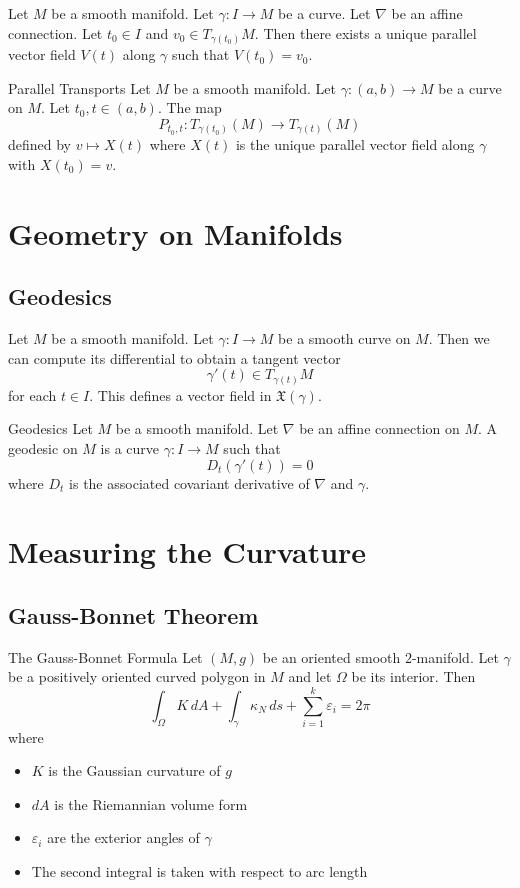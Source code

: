 \documentclass[a4paper]{article}
\begin{document}
\begin{thm}{}{} Let $M$ be a smooth manifold. Let $\gamma:I\to M$ be a curve. Let $\nabla$ be an affine connection. Let $t_0\in I$ and $v_0\in T_{\gamma(t_0)}M$. Then there exists a unique parallel vector field $V(t)$ along $\gamma$ such that $V(t_0)=v_0$. 
\end{thm}

\begin{defn}{Parallel Transports}{} Let $M$ be a smooth manifold. Let $\gamma:(a,b)\to M$ be a curve on $M$. Let $t_0,t\in(a,b)$. The map $$P_{t_0,t}:T_{\gamma(t_0)}(M)\to T_{\gamma(t)}(M)$$ defined by $v\mapsto X(t)$ where $X(t)$ is the unique parallel vector field along $\gamma$ with $X(t_0)=v$. 
\end{defn}


\pagebreak
\section{Geometry on Manifolds}
\subsection{Geodesics}
Let $M$ be a smooth manifold. Let $\gamma:I\to M$ be a smooth curve on $M$. Then we can compute its differential to obtain a tangent vector $$\gamma'(t)\in T_{\gamma(t)}M$$ for each $t\in I$. This defines a vector field in $\mathfrak{X}(\gamma)$. 

\begin{defn}{Geodesics}{} Let $M$ be a smooth manifold. Let $\nabla$ be an affine connection on $M$. A geodesic on $M$ is a curve $\gamma:I\to M$ such that $$D_t(\gamma'(t))=0$$ where $D_t$ is the associated covariant derivative of $\nabla$ and $\gamma$. 
\end{defn}

\pagebreak
\section{Measuring the Curvature}
\subsection{Gauss-Bonnet Theorem}
\begin{thm}{The Gauss-Bonnet Formula}{} Let $(M,g)$ be an oriented smooth $2$-manifold. Let $\gamma$ be a positively oriented curved polygon in $M$ and let $\Omega$ be its interior. Then $$\int_\Omega K\,dA+\int_\gamma\kappa_N\,ds+\sum_{i=1}^k\varepsilon_i=2\pi$$ where 
\begin{itemize}
\item $K$ is the Gaussian curvature of $g$
\item $dA$ is the Riemannian volume form
\item $\varepsilon_i$ are the exterior angles of $\gamma$
\item The second integral is taken with respect to arc length
\end{itemize}	
\end{thm}
\end{document}
